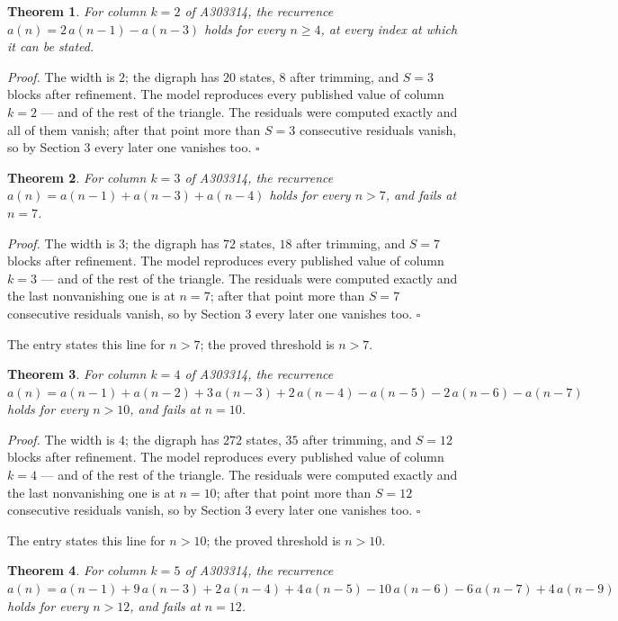 \documentclass[11pt]{article}
\newtheorem{theorem}{Theorem}
\theoremstyle{definition}
\begin{document}
\begin{theorem} For column $k = 2$ of A303314, the recurrence $a(n) = 2\,a(n-1) - a(n-3)$ holds for every $n \ge 4$, at every index at which it can be stated.\end{theorem}

{\itshape Proof.} The width is $2$; the digraph has $20$ states, $8$ after trimming, and $S = 3$ blocks after refinement. The model reproduces every published value of column $k = 2$ --- and of the rest of the triangle. The residuals were computed exactly and all of them vanish; after that point more than $S = 3$ consecutive residuals vanish, so by Section 3 every later one vanishes too. $\square$

\begin{theorem} For column $k = 3$ of A303314, the recurrence $a(n) = a(n-1) + a(n-3) + a(n-4)$ holds for every $n > 7$, and fails at $n = 7$.\end{theorem}

{\itshape Proof.} The width is $3$; the digraph has $72$ states, $18$ after trimming, and $S = 7$ blocks after refinement. The model reproduces every published value of column $k = 3$ --- and of the rest of the triangle. The residuals were computed exactly and the last nonvanishing one is at $n = 7$; after that point more than $S = 7$ consecutive residuals vanish, so by Section 3 every later one vanishes too. $\square$

The entry states this line for $n > 7$; the proved threshold is $n > 7$.

\begin{theorem} For column $k = 4$ of A303314, the recurrence $a(n) = a(n-1) + a(n-2) + 3\,a(n-3) + 2\,a(n-4) - a(n-5) - 2\,a(n-6) - a(n-7)$ holds for every $n > 10$, and fails at $n = 10$.\end{theorem}

{\itshape Proof.} The width is $4$; the digraph has $272$ states, $35$ after trimming, and $S = 12$ blocks after refinement. The model reproduces every published value of column $k = 4$ --- and of the rest of the triangle. The residuals were computed exactly and the last nonvanishing one is at $n = 10$; after that point more than $S = 12$ consecutive residuals vanish, so by Section 3 every later one vanishes too. $\square$

The entry states this line for $n > 10$; the proved threshold is $n > 10$.

\begin{theorem} For column $k = 5$ of A303314, the recurrence $a(n) = a(n-1) + 9\,a(n-3) + 2\,a(n-4) + 4\,a(n-5) - 10\,a(n-6) - 6\,a(n-7) + 4\,a(n-9)$ holds for every $n > 12$, and fails at $n = 12$.\end{theorem}
\end{document}

